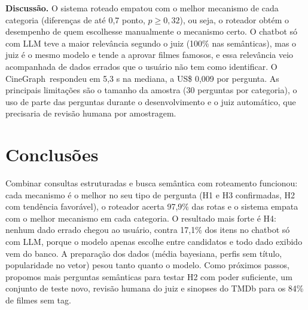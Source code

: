 \documentclass[11pt,a4paper]{article}
\newcommand{\cg}{CineGraph}
\begin{document}
\textbf{Discussão.} O sistema roteado empatou com o melhor mecanismo de cada categoria
(diferenças de até 0,7 ponto, $p\ge0{,}32$), ou seja, o roteador obtém o desempenho de quem
escolhesse manualmente o mecanismo certo. O chatbot só com LLM teve a maior relevância
segundo o juiz (100\% nas semânticas), mas o juiz é o mesmo modelo e tende a aprovar filmes
famosos, e essa relevância veio acompanhada de dados errados que o usuário não tem como
identificar. O \cg\ respondeu em 5,3 s na mediana, a US\$ 0,009 por pergunta. As principais
limitações são o tamanho da amostra (30 perguntas por categoria), o uso de parte das
perguntas durante o desenvolvimento e o juiz automático, que precisaria de revisão humana
por amostragem.

\section{Conclusões}

Combinar consultas estruturadas e busca semântica com roteamento funcionou: cada mecanismo é
o melhor no seu tipo de pergunta (H1 e H3 confirmadas, H2 com tendência favorável), o
roteador acerta 97,9\% das rotas e o sistema empata com o melhor mecanismo em cada
categoria. O resultado mais forte é H4: nenhum dado errado chegou ao usuário, contra 17,1\%
dos itens no chatbot só com LLM, porque o modelo apenas escolhe entre candidatos e todo dado
exibido vem do banco. A preparação dos dados (média bayesiana, perfis sem título,
popularidade no vetor) pesou tanto quanto o modelo. Como próximos passos, propomos mais
perguntas semânticas para testar H2 com poder suficiente, um conjunto de teste novo,
revisão humana do juiz e sinopses do TMDb para os 84\% de filmes sem tag.


\end{document}
